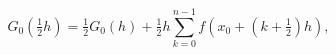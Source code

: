 \[G_{0}(\tfrac{1}{2}h)=\tfrac{1}{2}G_{0}(h)+\tfrac{1}{2}h\sum_{k=0}^{n-1}f\left(%
x_{0}+(k+\tfrac{1}{2})h\right),\]